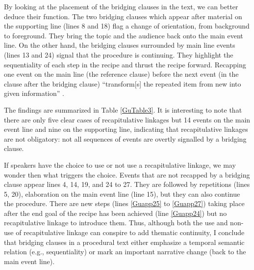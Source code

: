\documentclass[output=paper]{LSP/langsci}
\begin{document}
By looking at the placement of the bridging clauses in the text, we can better deduce their function. The two bridging clauses which appear after material on the supporting line (lines 8 and 18) flag a change of orientation, from background to foreground. They bring the topic and the audience back onto the main event line. On the other hand, the bridging clauses surrounded by main line events (lines 13 and 24) signal that the procedure is continuing. They highlight the sequentiality of each step in the recipe and thrust the recipe forward. Recapping one event on the main line (the reference clause) before the next event (in the clause after the bridging clause) ``transform[s] the repeated item from new into given information'' \citep[][224]{brown.2000}.   

The findings are summarized in Table \ref{GuTable3}. It is interesting to note that there are only five clear cases of recapitulative linkages but 14 events on the main event line and nine on the supporting line, indicating that recapitulative linkages are not obligatory: not all sequences of events are overtly signalled by a bridging clause. 

If speakers have the choice to use or not use a recapitulative linkage, we may wonder then what triggers the choice. Events that are not recapped by a bridging clause appear lines 4, 14, 19, and 24 to 27.  They are followed by repetitions (lines 5, 20), elaboration on the main event line (line 15), but they can also continue the procedure. There are new steps (lines \ref{Guapp25} to \ref{Guapp27}) taking place after the end goal of the recipe has been achieved  (line \ref{Guapp24}) but no recapitulative linkage to introduce them. Thus, although both the use and non-use of recapitulative linkage can conspire to add thematic continuity, I conclude that bridging clauses in a procedural text either emphasize a temporal semantic relation (e.g., sequentiality) or mark an important narrative change (back to the main event line). 
\end{document}
